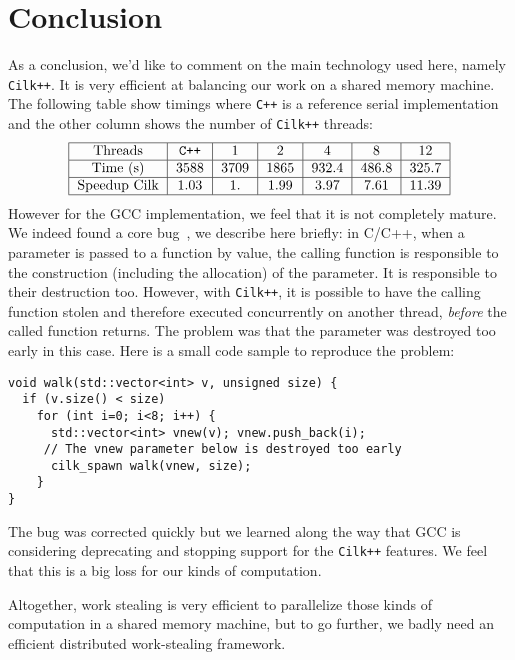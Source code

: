 \documentclass{deliverablereport}
\newcommand{\CilkP}{\texttt{Cilk++}\xspace}
\begin{document}

\section{Conclusion}

As a conclusion, we'd like to comment on the main technology used here, namely
\CilkP. It is very efficient at balancing our work on a shared memory
machine. The following table show timings where \verb|C++| is a reference serial
implementation and the other column shows the number of \CilkP threads:
\[\begin{tabular}{|c|c|c|c|c|c|c|}
\hline
 Threads & \texttt{C++} & 1 & 2 & 4 & 8 & 12 \\
 \hline
 Time (s) & 3588 & 3709 & 1865 & 932.4 & 486.8 & 325.7 \\
 \hline
 Speedup Cilk & 1.03 & 1. & 1.99 & 3.97 & 7.61 & 11.39 \\
 \hline
\end{tabular}
\]
However for the GCC implementation, we feel that it is not completely
mature. We indeed found a core bug~\cite{gcc-bug-80038}, we describe here
briefly: in C/C++, when a parameter is passed to a function by value, the
calling function is responsible to the construction (including the allocation)
of the parameter. It is responsible to their destruction too. However, with
\CilkP, it is possible to have the calling function stolen and therefore
executed concurrently on another thread, \emph{before} the called function
returns. The problem was that the parameter was destroyed too early in this
case. Here is a small code sample to reproduce the problem:
\begin{verbatim}
void walk(std::vector<int> v, unsigned size) {
  if (v.size() < size)
    for (int i=0; i<8; i++) {
      std::vector<int> vnew(v); vnew.push_back(i);
     // The vnew parameter below is destroyed too early
      cilk_spawn walk(vnew, size); 
    }
}
\end{verbatim}
The bug was corrected quickly but we learned along the way that GCC is
considering deprecating and stopping support for the \CilkP features. We feel
that this is a big loss for our kinds of computation.

Altogether, work stealing is very efficient to parallelize those kinds of
computation in a shared memory machine, but to go further, we badly need an
efficient distributed work-stealing framework.


\printbibliography
\end{document}
